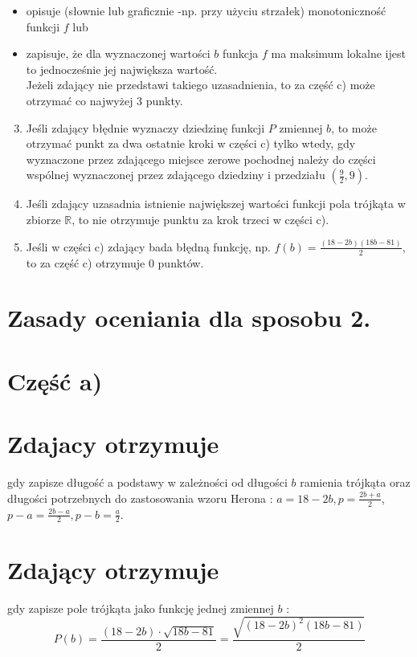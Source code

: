 \documentclass[10pt]{article}
\begin{document}
\begin{itemize}
  \item opisuje (słownie lub graficznie -np. przy użyciu strzałek) monotoniczność funkcji $f$ lub
  \item zapisuje, że dla wyznaczonej wartości $b$ funkcja $f$ ma maksimum lokalne ijest to jednocześnie jej największa wartość.\\
Jeżeli zdający nie przedstawi takiego uzasadnienia, to za część c) może otrzymać co najwyżej 3 punkty.
\end{itemize}

\begin{enumerate}
  \setcounter{enumi}{2}
  \item Jeśli zdający błędnie wyznaczy dziedzinę funkcji $P$ zmiennej $b$, to może otrzymać punkt za dwa ostatnie kroki w części c) tylko wtedy, gdy wyznaczone przez zdającego miejsce zerowe pochodnej należy do części wspólnej wyznaczonej przez zdającego dziedziny i przedziału $\left(\frac{9}{2}, 9\right)$.
  \item Jeśli zdający uzasadnia istnienie największej wartości funkcji pola trójkąta w zbiorze $\mathbb{R}$, to nie otrzymuje punktu za krok trzeci w części c).
  \item Jeśli w części c) zdający bada błędną funkcję, np. $f(b)=\frac{(18-2 b)(18 b-81)}{2}$, to za część c) otrzymuje 0 punktów.
\end{enumerate}

\section*{Zasady oceniania dla sposobu 2.}
\section*{Część a)}
\section*{Zdajacy otrzymuje}
gdy zapisze długość a podstawy w zależności od długości $b$ ramienia trójkąta oraz długości potrzebnych do zastosowania wzoru Herona : $a=18-2 b, p=\frac{2 b+a}{2}$,\\
$p-a=\frac{2 b-a}{2}, p-b=\frac{a}{2}$.

\section*{Zdający otrzymuje}
 gdy zapisze pole trójkąta jako funkcję jednej zmiennej $b$ :$$
P(b)=\frac{(18-2 b) \cdot \sqrt{18 b-81}}{2}=\frac{\sqrt{(18-2 b)^{2}(18 b-81)}}{2}
$$
\end{document}
